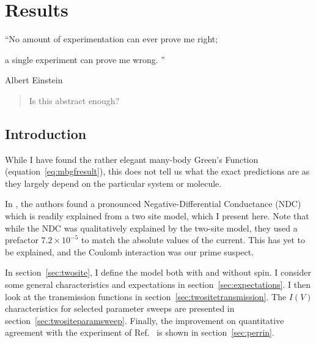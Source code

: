 \chapter{Results}
\label{ch:chapter_4}




\epigraph{
    “No amount of experimentation can ever prove me right;
    
    a single experiment can prove me wrong. ”
}{Albert Einstein}

\begin{abstract}
Is this abstract enough?
\end{abstract}

\newpage
\section{Introduction}
While I have found the rather elegant many-body Green's Function (equation~\ref{eq:mbgfresult}), this does not tell us what the exact predictions are as they largely depend on the particular system or molecule.

In \citet{perrinnano}, the authors found a pronounced Negative-Differential Conductance (NDC) which is readily explained from a two site model, which I present here. Note that while the NDC was qualitatively explained by the two-site model, they used a prefactor $7.2 \times 10^{-5}$ to match the absolute values of the current. This has yet to be explained, and the Coulomb interaction was our prime suspect.

In section~\ref{sec:twosite}, I define the model both with and without spin. I consider some general characteristics and expectations in section~\ref{sec:expectations}. I then look at the transmission functions in section~\ref{sec:twositetransmission}. The $I(V)$ characteristics for selected parameter sweeps are presented in section~\ref{sec:twositeparamsweep}. Finally, the improvement on quantitative agreement with the experiment of Ref.~\cite{perrinnano} is shown in section~\ref{sec:perrin}.


